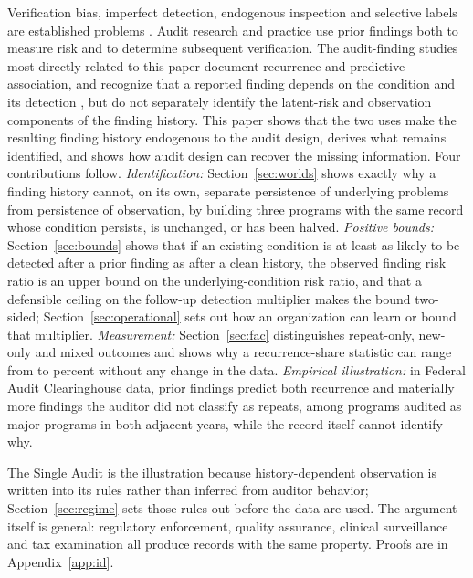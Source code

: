 Verification bias, imperfect detection, endogenous inspection and selective
labels are established problems
\citep{ransohoff1978,begg1983,mackenzie2002,heckman1978,lakkaraju2017,waymire2018}.
Audit research and practice use prior findings both to measure risk and to
determine subsequent verification. The audit-finding studies most directly related to this paper document
recurrence and predictive association, and recognize that a reported finding
depends on the condition and its detection
\citep{keating2005,petrovits2011,rice2012,waymire2018}, but do not
separately identify the latent-risk and observation components of the
finding history. This paper shows that the two uses make the resulting finding
history endogenous to the audit design, derives what remains identified, and
shows how audit design can recover the missing information. Four
contributions follow.
\emph{Identification:} Section~\ref{sec:worlds} shows exactly why a finding
history cannot, on its own, separate persistence of underlying problems from
persistence of observation, by building three programs with the same record
whose condition persists, is unchanged, or has been halved. \emph{Positive
bounds:} Section~\ref{sec:bounds} shows that if an existing condition is at
least as likely to be detected after a prior finding as after a clean history,
the observed finding risk ratio is an upper bound on the underlying-condition
risk ratio, and that a defensible ceiling on the follow-up detection
multiplier makes the bound two-sided; Section~\ref{sec:operational} sets out
how an organization can learn or bound that multiplier. \emph{Measurement:}
Section~\ref{sec:fac} distinguishes repeat-only, new-only and mixed outcomes
and shows why a recurrence-share statistic can range from \nZetaLo{} to
\nZetaHi{} percent without any change in the data. \emph{Empirical
illustration:} in Federal Audit Clearinghouse data, prior findings predict
both recurrence and materially more findings the auditor did not classify as
repeats, among programs audited as major programs in both adjacent years,
while the record itself cannot identify why.

The Single Audit is the illustration because history-dependent observation is
written into its rules rather than inferred from auditor behavior;
Section~\ref{sec:regime} sets those rules out before the data are used. The
argument itself is general: regulatory enforcement, quality assurance,
clinical surveillance and tax examination all produce records with the same
property. Proofs are in Appendix~\ref{app:id}.

